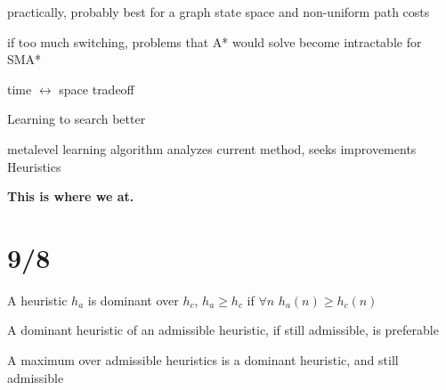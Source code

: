 \documentclass[12pt]{article}
\begin{document}
practically, probably best for a graph state space and non-uniform path costs

if too much switching, problems that A* would solve become intractable for SMA*

time $\leftrightarrow$ space tradeoff

\noindent
Learning to search better

metalevel learning algorithm analyzes current method, seeks improvements\\

\noindent
Heuristics







\textbf{This is where we at.}\\

\section{9/8}

A heuristic $h_a$ is dominant over $h_c$, $h_a \geq h_c$ if $\forall n$ $h_a(n) \geq h_c(n)$

A dominant heuristic of an admissible heuristic, if still admissible, is preferable

A maximum over admissible heuristics is a dominant heuristic, and still admissible
\end{document}
